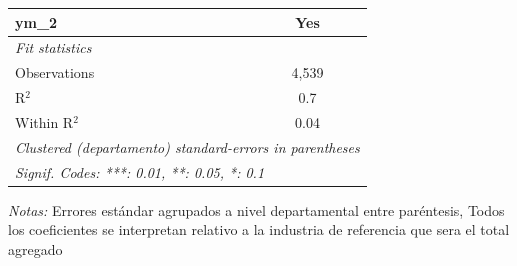 \documentclass[12pt]{article}
\begin{document}
\begin{table}[htbp]
\begin{threeparttable}
\begin{tabular}{lc}
      ym\_2                                                                                                                       & Yes\\  
      \midrule
      \emph{Fit statistics}\\
      Observations                                                                                                                & 4,539\\  
      R$^2$                                                                                                                       & 0.7\\  
      Within R$^2$                                                                                                                & 0.04\\  
      \midrule \midrule
      \multicolumn{2}{l}{\emph{Clustered (departamento) standard-errors in parentheses}}\\
      \multicolumn{2}{l}{\emph{Signif. Codes: ***: 0.01, **: 0.05, *: 0.1}}\\
   \end{tabular}


\begin{tablenotes}
\footnotesize
\item \textit{Notas:} Errores estándar agrupados a nivel departamental entre paréntesis, Todos los coeficientes se interpretan relativo a la industria de referencia que sera el total agregado
\end{tablenotes}
\end{threeparttable}
\end{table}
\end{document}
